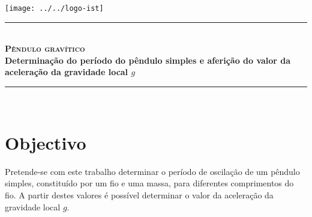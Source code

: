 \documentclass[a4paper,twoside,12pt]{article}      %
\author{Prof. Bernardo B. Carvalho}
\date{ Setembro 2018}
\newcommand{\HRule}{\rule{\linewidth}{0.5mm}}
\begin{document}
 

\texttt{[image: ../../logo-ist]}%
	
	\HRule \\[0.5cm]
	{ \huge   \bfseries \textsc{ Pêndulo gravítico } }\\[0.4cm]
	{ \large \bfseries Determinação do período do pêndulo simples e aferição do valor da aceleração da gravidade local $g$  }\\
	\HRule \\%
	
%	 


\section{\sf Objectivo}

Pretende-se com este trabalho determinar o período de oscilação de um pêndulo simples, constituído por um fio e uma massa, para diferentes comprimentos do fio. A partir destes valores é possível determinar o valor da aceleração da gravidade local $g$.
\end{document}
